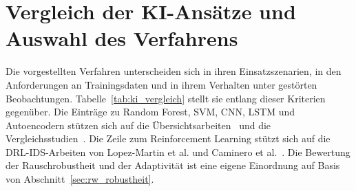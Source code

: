 \section{Vergleich der KI-Ansätze und Auswahl des Verfahrens}
\label{sec:ansatz_vergleich}

Die vorgestellten Verfahren unterscheiden sich in ihren Einsatzszenarien, in den Anforderungen an Trainingsdaten und in ihrem Verhalten unter gestörten Beobachtungen. Tabelle~\ref{tab:ki_vergleich} stellt sie entlang dieser Kriterien gegenüber. Die Einträge zu Random Forest, SVM, CNN, LSTM und Autoencodern stützen sich auf die Übersichtsarbeiten~\autocite{balaAITechniquesIoTbased2024, kumarComprehensiveReviewVulnerabilities2024} und die Vergleichsstudien~\autocite{koComparativeStudyAIEnabled2023, razaFeatureSelectionBasedDDoSAttack2024}. Die Zeile zum Reinforcement Learning stützt sich auf die DRL-IDS-Arbeiten von Lopez-Martin et al. und Caminero et al.~\autocite{lopez-martinApplicationDeepReinforcement2020, camineroAdversarialEnvironmentReinforcement2019}. Die Bewertung der Rauschrobustheit und der Adaptivität ist eine eigene Einordnung auf Basis von Abschnitt~\ref{sec:rw_robustheit}.

